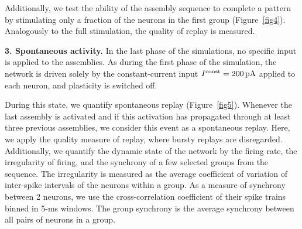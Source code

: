       Additionally, we test the ability of the assembly sequence to complete a
      pattern by stimulating only a fraction of the neurons in the first group
      (Figure~\ref{fig4}). Analogously to the full stimulation, the quality of
      replay is measured.

    \textbf{3. Spontaneous activity.}
      In the last phase of the simulations, no specific input is applied to the
      assemblies. As during the first phase of the simulation, the network is
      driven solely by the constant-current input $I^{ \rm const}=200 \,\rm pA$
      applied to each neuron, and plasticity is switched off.

      During this state, we quantify spontaneous replay (Figure~\ref{fig5}).
      Whenever the last assembly is activated and if this activation has
      propagated through at least three previous assemblies, we consider this
      event as a spontaneous replay. Here, we apply the quality measure of
      replay, where bursty replays are disregarded. Additionally, we quantify
      the dynamic state of the network by the firing rate, the irregularity of
      firing, and the synchrony of a few selected groups from the sequence.
      The irregularity is measured as the average coefficient of variation of
      inter-spike intervals of the neurons within a group. As a measure of
      synchrony between 2 neurons, we use the cross-correlation coefficient of
      their spike trains binned in 5-ms windows. The group synchrony is the
      average synchrony between all pairs of neurons in a group.

